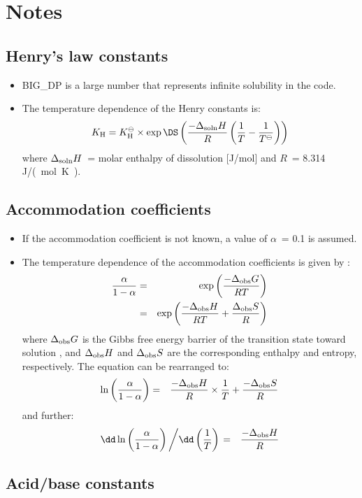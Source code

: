 \immediate\closeout\henrynotefile
\immediate\closeout\alphanotefile
\immediate\closeout\acidnotefile

\section*{Notes}

\subsection*{Henry's law constants}

\begin{itemize}
\item BIG\_DP is a large number that represents infinite solubility in
  the code.
\item The temperature dependence of the Henry constants is:
  $$K_{\rm H} = K_{\rm H}^{\ominus} \times \exp \DS\left(
    \frac{-\Delta_{\rm soln}H}{R} \left( \frac{1}{T} -
      \frac{1}{T^{\ominus}} \right) \right)$$
  where $\Delta_{\rm soln}H$~= molar enthalpy of dissolution
  [\unit{J/mol}] and $R$~= 8.314 \unit{J/(mol~K)}.

\end{itemize}

\subsection*{Accommodation coefficients}

\begin{itemize}
\item If the accommodation coefficient is not known, a value of
  $\alpha$~= 0.1 is assumed.
\item The temperature dependence of the accommodation coefficients is
  given by \citep{155}:
  \begin{eqnarray*}
    \frac{\alpha}{1-\alpha} & = & \exp \left( \frac{-\Delta_{\rm obs}G}{RT}
    \right)\\
    & = & \exp \left( \frac{-\Delta_{\rm obs}H}{RT} + \frac{\Delta_{\rm
    obs}S}{R} \right)
  \end{eqnarray*}
  where $\Delta_{\rm obs}G$ is the Gibbs free energy barrier of the
  transition state toward solution \citep{155}, and $\Delta_{\rm obs}H$
  and $\Delta_{\rm obs}S$ are the corresponding enthalpy and entropy,
  respectively. The equation can be rearranged to:
  \begin{eqnarray*}
    \ln\left( \frac{\alpha}{1-\alpha} \right) & = & 
    \frac{-\Delta_{\rm obs}H}{R} \times \frac{1}{T} + \frac{-\Delta_{\rm
    obs}S}{R}\\
  \end{eqnarray*}
  and further:
  \begin{eqnarray*}
    \dd\ln\left( \frac{\alpha}{1-\alpha} \right) \left/ \dd\left(
    \frac{1}{T} \right)\right. & = & \frac{-\Delta_{\rm obs}H}{R}
  \end{eqnarray*}

\end{itemize}

\subsection*{Acid/base constants}
\begin{itemize}

\end{itemize}

\clearpage


